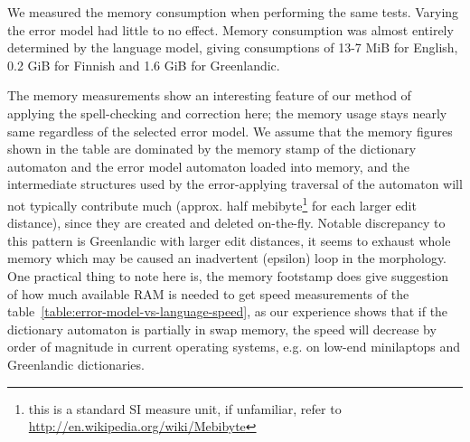 \documentclass[free]{flammie}
\begin{document}
We measured the memory
consumption when performing the same tests. Varying the error model had little
to no effect. Memory consumption was almost entirely determined by the language
model, giving consumptions of 13-7 MiB for English, 0.2 GiB for Finnish and
1.6 GiB for Greenlandic.


The memory measurements show an interesting feature of our method of applying
the spell-checking and correction here; the memory usage stays nearly same
regardless of the selected error model. We assume that the memory figures shown
in the table are dominated by the memory stamp of the dictionary automaton and
the error model automaton loaded into memory, and the intermediate structures
used by the error-applying traversal of the automaton will not typically
contribute much (approx. half mebibyte\footnote{this is a standard SI measure
unit, if unfamiliar, refer to \url{http://en.wikipedia.org/wiki/Mebibyte}} for
each larger edit distance), since they are created and deleted on-the-fly.
Notable discrepancy to this pattern is Greenlandic with larger edit distances,
it seems to exhaust whole memory which may be caused an inadvertent (epsilon)
loop in the morphology. One practical thing to note here is, the memory
footstamp does give suggestion of how much available RAM is needed to get speed
measurements of the table~\ref{table:error-model-vs-language-speed}, as our
experience shows that if the dictionary automaton is partially in swap memory,
the speed will decrease by order of magnitude in current operating systems,
e.g. on low-end minilaptops and Greenlandic dictionaries.
\end{document}
